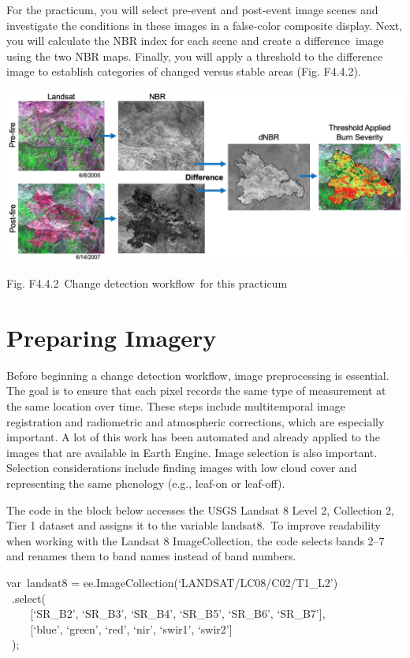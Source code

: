 \documentclass[
  letterpaper,
  DIV=11,
  numbers=noendperiod]{scrreprt}
\begin{document}
For the practicum, you will select pre-event and post-event image scenes
and investigate the conditions in these images in a false-color
composite display. Next, you will calculate the NBR index for each scene
and create a difference~image using the two NBR maps. Finally, you will
apply a threshold to the difference image to establish categories of
changed versus stable areas (Fig. F4.4.2).

\includegraphics{./F4/image68.png}

Fig. F4.4.2~Change detection workflow~for this practicum

\hypertarget{preparing-imagery}{%
\section{Preparing Imagery}\label{preparing-imagery}}

Before beginning a change detection workflow, image preprocessing is
essential. The goal is to ensure that each pixel records the same type
of measurement at the same location over time. These steps include
multitemporal image registration and radiometric and atmospheric
corrections, which are especially important. A lot of this work has been
automated and already applied to the images that are available in Earth
Engine. Image selection is also important. Selection considerations
include finding images with low cloud cover and representing the same
phenology (e.g., leaf-on or leaf-off).

The code in the block below accesses the USGS Landsat 8 Level 2,
Collection 2, Tier 1 dataset and assigns it to the variable landsat8.~To
improve readability when working with the Landsat 8 ImageCollection, the
code selects bands 2--7 and renames them to band names instead of band
numbers.

var~landsat8 = ee.ImageCollection(`LANDSAT/LC08/C02/T1\_L2')\\
\hspace*{0.333em} ~.select(\\
\hspace*{0.333em} ~ ~ ~{[}`SR\_B2', `SR\_B3', `SR\_B4', `SR\_B5',
`SR\_B6', `SR\_B7'{]},\\
\hspace*{0.333em} ~ ~ ~{[}`blue', `green', `red', `nir', `swir1',
`swir2'{]}\\
\hspace*{0.333em} ~);
\end{document}
